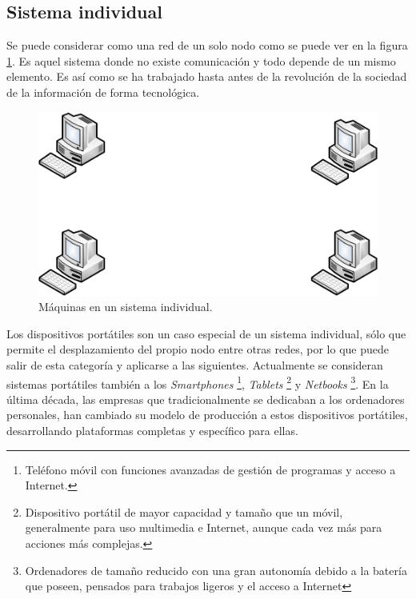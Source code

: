 \subsection{Sistema individual}
Se puede considerar como una red de un solo nodo como se puede ver en 
la figura \ref{fig:sindividual}. Es aquel sistema 
donde no existe comunicación y todo depende de un mismo elemento. Es 
así como se ha trabajado hasta antes de la revolución de la sociedad 
de la información de forma tecnológica.

\begin{figure}[h]
	\centering
	\includegraphics[scale=0.5]{images/sindividuales.png}
	\caption[Sistema individual]{Máquinas en un sistema individual.}
	\label{fig:sindividual}
\end{figure}

Los dispositivos portátiles son un caso especial de un sistema 
individual, sólo que permite el desplazamiento del propio nodo entre 
otras redes, por lo que puede salir de esta categoría y aplicarse a 
las siguientes. Actualmente se consideran sistemas portátiles también 
a los \emph{Smartphones} \footnote{Teléfono móvil con funciones 
avanzadas de gestión de programas y acceso a Internet.}, 
\emph{Tablets} \footnote{Dispositivo portátil de 
mayor capacidad y tamaño que un móvil, generalmente para uso 
multimedia e Internet, aunque cada vez más para acciones más 
complejas.} y \emph{Netbooks} \footnote{Ordenadores de tamaño reducido 
con una gran autonomía debido a la batería que poseen, pensados para 
trabajos ligeros y el acceso a Internet}. En la última década, las empresas que 
tradicionalmente se dedicaban a los ordenadores personales, han 
cambiado su modelo de producción a estos dispositivos portátiles, 
desarrollando plataformas completas y \software específico para ellas.

